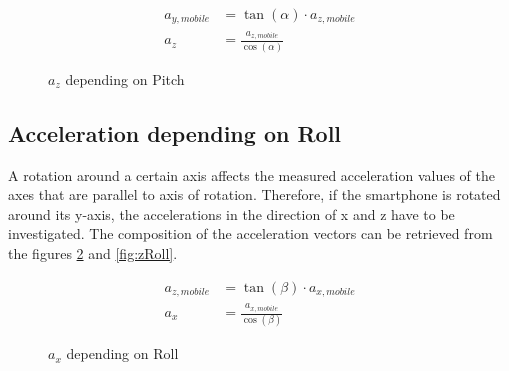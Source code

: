 \documentclass[12pt, a4paper, oneside, british]{article}
\begin{document}
\begin{figure}[htb]
    \centering
    \begin{minipage}{0.5\textwidth}
        \centering
        \captionsetup{justification=centering}
        
        \caption{$a_z$ depending on Pitch}
        \label{fig:zPitch}
    \end{minipage}%
    \hfill
    \begin{minipage}{0.5\textwidth}
        \centering
			\begin{align} 
				a_{y, mobile} &= \tan(\alpha) \cdot a_{z, mobile}\\ 
				a_z &= \frac{a_{z, mobile}}{\cos(\alpha)}
			\end{align}
    \end{minipage}
\end{figure}

\FloatBarrier
\subsection{Acceleration depending on Roll}
A rotation around a certain axis affects the measured acceleration values of the
axes that are parallel to axis of rotation. Therefore, if the smartphone is
rotated around its y-axis, the accelerations in the direction of x and z have to
be investigated. The composition of the acceleration vectors can be retrieved
from the figures \ref{fig:xRoll} and \ref{fig:zRoll}.

\begin{figure}[htb]
    \centering
    \begin{minipage}{0.5\textwidth}
        \centering
        \captionsetup{justification=centering}
        
        \caption{$a_x$ depending on Roll}
        \label{fig:xRoll}
    \end{minipage}%
    \hfill
    \begin{minipage}{0.5\textwidth}
        \centering
			\begin{align} 
				a_{z, mobile} &= \tan(\beta) \cdot {a_{x, mobile}}\\
				a_x &= \frac{a_{x, mobile}}{\cos(\beta)}
			\end{align}
    \end{minipage}
\end{figure}
\end{document}
